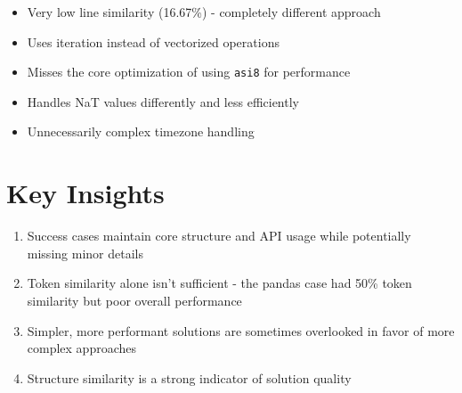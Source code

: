 \documentclass{article}
\begin{document}
\begin{tcolorbox}[colback=LightRed!10,title=Failure Analysis]
\begin{itemize}
\item Very low line similarity (16.67\%) - completely different approach
\item Uses iteration instead of vectorized operations
\item Misses the core optimization of using \texttt{asi8} for performance
\item Handles NaT values differently and less efficiently
\item Unnecessarily complex timezone handling
\end{itemize}
\end{tcolorbox}

\section{Key Insights}

\begin{enumerate}
\item Success cases maintain core structure and API usage while potentially missing minor details
\item Token similarity alone isn't sufficient - the pandas case had 50\% token similarity but poor overall performance
\item Simpler, more performant solutions are sometimes overlooked in favor of more complex approaches
\item Structure similarity is a strong indicator of solution quality
\end{enumerate}
\end{document}
